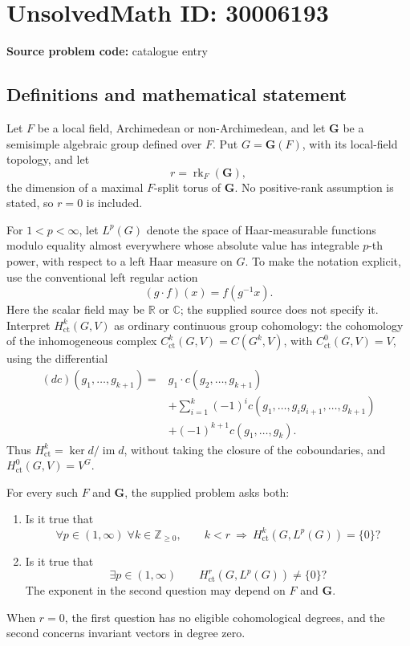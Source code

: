 \documentclass[11pt]{article}
\begin{document}
\section*{UnsolvedMath ID: 30006193}
\textbf{Source problem code:} catalogue entry
\subsection{Definitions and mathematical statement}
Let \(F\) be a local field, Archimedean or non-Archimedean, and let \(\mathbf G\) be a semisimple algebraic group defined over \(F\). Put \(G=\mathbf G(F)\), with its local-field topology, and let
\[
r=\operatorname{rk}_F(\mathbf G),
\]
the dimension of a maximal \(F\)-split torus of \(\mathbf G\). No positive-rank assumption is stated, so \(r=0\) is included.

For \(1<p<\infty\), let \(L^p(G)\) denote the space of Haar-measurable functions modulo equality almost everywhere whose absolute value has integrable \(p\)-th power, with respect to a left Haar measure on \(G\). To make the notation explicit, use the conventional left regular action
\[
(g\cdot f)(x)=f(g^{-1}x).
\]
Here the scalar field may be \(\mathbb R\) or \(\mathbb C\); the supplied source does not specify it. Interpret \(H^k_{\mathrm{ct}}(G,V)\) as ordinary continuous group cohomology: the cohomology of the inhomogeneous complex \(C^k_{\mathrm{ct}}(G,V)=C(G^k,V)\), with \(C^0_{\mathrm{ct}}(G,V)=V\), using the differential
\[
\begin{aligned}
(dc)(g_1,\ldots,g_{k+1})
={}&g_1\cdot c(g_2,\ldots,g_{k+1})\\
&+\sum_{i=1}^{k}(-1)^i c(g_1,\ldots,g_i g_{i+1},\ldots,g_{k+1})\\
&+(-1)^{k+1}c(g_1,\ldots,g_k).
\end{aligned}
\]
Thus \(H^k_{\mathrm{ct}}=\ker d/\operatorname{im}d\), without taking the closure of the coboundaries, and \(H^0_{\mathrm{ct}}(G,V)=V^G\).

For every such \(F\) and \(\mathbf G\), the supplied problem asks both:
\begin{enumerate}
\item Is it true that
\[
\forall p\in(1,\infty)\;\forall k\in\mathbb Z_{\geq 0},\qquad
k<r\ \Longrightarrow\ H^k_{\mathrm{ct}}(G,L^p(G))=\{0\}?
\]
\item Is it true that
\[
\exists p\in(1,\infty)\qquad H^r_{\mathrm{ct}}(G,L^p(G))\neq\{0\}?
\]
The exponent in the second question may depend on \(F\) and \(\mathbf G\).
\end{enumerate}
When \(r=0\), the first question has no eligible cohomological degrees, and the second concerns invariant vectors in degree zero.
\end{document}
